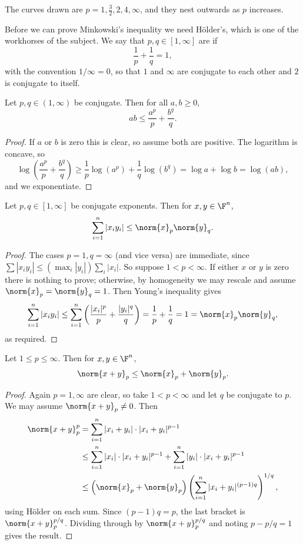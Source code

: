 The curves drawn are $p = 1, \frac32, 2, 4, \infty$, and they nest outwards as $p$ increases.

Before we can prove Minkowski's inequality we need Hölder's, which is one of the workhorses of the subject. We say that $p, q \in [1, \infty]$ are  if
$$\frac{1}{p} + \frac{1}{q} = 1,$$
with the convention $1/\infty = 0$, so that $1$ and $\infty$ are conjugate to each other and $2$ is conjugate to itself.

\begin{lemma}
	Let $p, q \in (1, \infty)$ be conjugate. Then for all $a, b \geq 0$,
	$$ab \leq \frac{a^p}{p} + \frac{b^q}{q}.$$
\end{lemma}

\begin{proof}
	If $a$ or $b$ is zero this is clear, so assume both are positive. The logarithm is concave, so
	$$\log\left( \frac{a^p}{p} + \frac{b^q}{q} \right) \geq \frac{1}{p} \log(a^p) + \frac{1}{q} \log(b^q) = \log a + \log b = \log(ab),$$
	and we exponentiate.
\end{proof}

\begin{proposition}
	Let $p, q \in [1, \infty]$ be conjugate exponents. Then for $x, y \in \F^n$,
	$$\sum_{i=1}^n |x_i y_i| \leq \norm{x}_p \norm{y}_q.$$
\end{proposition}

\begin{proof}
	The cases $p = 1, q = \infty$ (and vice versa) are immediate, since $\sum |x_iy_i| \leq (\max_i |y_i|) \sum_i |x_i|$. So suppose $1 < p < \infty$. If either $x$ or $y$ is zero there is nothing to prove; otherwise, by homogeneity we may rescale and assume $\norm{x}_p = \norm{y}_q = 1$. Then Young's inequality gives
	$$\sum_{i=1}^n |x_i y_i| \leq \sum_{i=1}^n \left( \frac{|x_i|^p}{p} + \frac{|y_i|^q}{q} \right) = \frac{1}{p} + \frac{1}{q} = 1 = \norm{x}_p \norm{y}_q,$$
	as required.
\end{proof}

\begin{proposition}
	Let $1 \leq p \leq \infty$. Then for $x, y \in \F^n$,
	$$\norm{x + y}_p \leq \norm{x}_p + \norm{y}_p.$$
\end{proposition}

\begin{proof}
	Again $p = 1, \infty$ are clear, so take $1 < p < \infty$ and let $q$ be conjugate to $p$. We may assume $\norm{x+y}_p \neq 0$. Then
	\begin{align*}
		\norm{x+y}_p^p &= \sum_{i=1}^n |x_i + y_i| \cdot |x_i + y_i|^{p-1} \\
		&\leq \sum_{i=1}^n |x_i| \cdot |x_i + y_i|^{p-1} + \sum_{i=1}^n |y_i| \cdot |x_i + y_i|^{p-1} \\
		&\leq \left( \norm{x}_p + \norm{y}_p \right) \left( \sum_{i=1}^n |x_i + y_i|^{(p-1)q} \right)^{1/q},
	\end{align*}
	using Hölder on each sum. Since $(p-1)q = p$, the last bracket is $\norm{x+y}_p^{p/q}$. Dividing through by $\norm{x+y}_p^{p/q}$ and noting $p - p/q = 1$ gives the result.
\end{proof}

